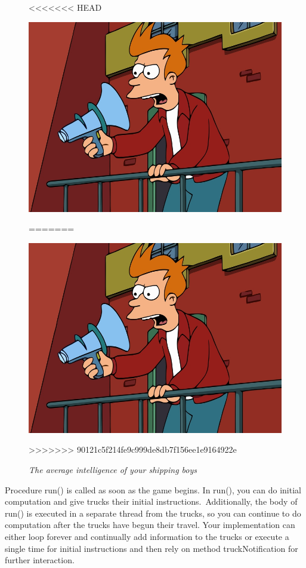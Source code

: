 \documentclass[11pt]{article}
\begin{document}
\begin{itemize}
\begin{figure}[h]
<<<<<<< HEAD
\centerline{\includegraphics[scale=0.35]{fry.jpg}} 
=======
\centerline{\includegraphics[scale=0.2]{fry.jpg}} 
>>>>>>> 90121c5f214fe9c999de8db7f156ee1e9164922e
\caption{\em{The average intelligence of your shipping boys}}
\end{figure}

Procedure run() is called as soon as the game begins. In run(), you can do initial computation and give trucks their initial instructions.\ Additionally, the body of run() is executed in a separate thread from the trucks, so you can continue to do computation after the trucks have begun their travel. Your implementation can either loop forever and continually add information to the trucks or execute a single time for initial instructions and then rely on method truckNotification for further interaction.\\


\end{itemize}
\end{document}

